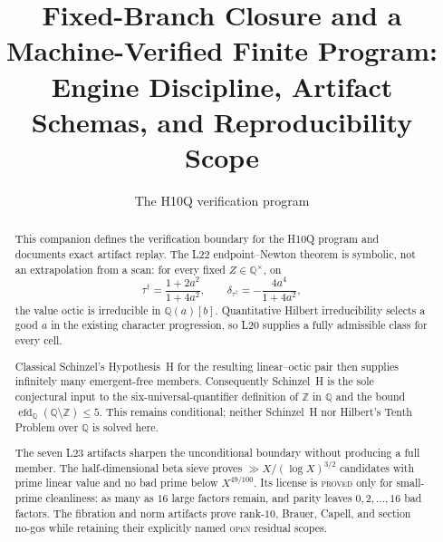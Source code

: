 \documentclass[11pt]{amsart}%
\title{Fixed-Branch Closure and a Machine-Verified Finite Program:\\
Engine Discipline, Artifact Schemas, and Reproducibility Scope}
\author{The H10Q verification program}
\date{}
\newcommand{\Q}{\mathbb{Q}}
\newcommand{\Z}{\mathbb{Z}}
\begin{document}
\begin{abstract}
This companion defines the verification boundary for the H10Q program and
documents exact artifact replay.  The L22 endpoint--Newton theorem is
symbolic, not an extrapolation from a scan: for every fixed
$Z\in\Q^\times$, on
\[
 \tau^\dagger=\frac{1+2a^2}{1+4a^2},
 \qquad \delta_{\tau^\dagger}=-\frac{4a^4}{1+4a^2},
\]
the value octic is irreducible in $\Q(a)[b]$.  Quantitative Hilbert
irreducibility selects a good $a$ in the existing character progression,
so L20 supplies a fully admissible class for every cell.

Classical Schinzel's Hypothesis~H for the resulting linear--octic pair then
supplies infinitely many emergent-free members.  Consequently Schinzel~H
is the sole conjectural input to the six-universal-quantifier definition
of $\Z$ in $\Q$ and the bound
$\operatorname{efd}_{\Q}(\Q\setminus\Z)\le5$.  This remains conditional;
neither Schinzel~H nor Hilbert's Tenth Problem over $\Q$ is solved here.

The seven L23 artifacts sharpen the unconditional boundary without
producing a full member.  The half-dimensional beta sieve proves
\(\gg X/(\log X)^{3/2}\) candidates with prime linear value and no bad
prime below \(X^{49/100}\).  Its license is \textsc{proved} only for
small-prime cleanliness: as many as \(16\) large factors remain, and
parity leaves \(0,2,\ldots,16\) bad factors.  The fibration and norm
artifacts prove rank-\(10\), Brauer, Capell, and section no-gos while
retaining their explicitly named \textsc{open} residual scopes.


\end{abstract}
\end{document}
